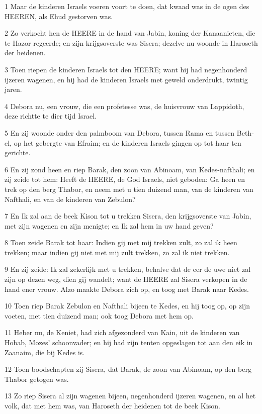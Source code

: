 \par 1 Maar de kinderen Israels voeren voort te doen, dat kwaad was in de ogen des HEEREN, als Ehud gestorven was.
\par 2 Zo verkocht hen de HEERE in de hand van Jabin, koning der Kanaanieten, die te Hazor regeerde; en zijn krijgsoverste was Sisera; dezelve nu woonde in Haroseth der heidenen.
\par 3 Toen riepen de kinderen Israels tot den HEERE; want hij had negenhonderd ijzeren wagenen, en hij had de kinderen Israels met geweld onderdrukt, twintig jaren.
\par 4 Debora nu, een vrouw, die een profetesse was, de huisvrouw van Lappidoth, deze richtte te dier tijd Israel.
\par 5 En zij woonde onder den palmboom van Debora, tussen Rama en tussen Beth-el, op het gebergte van Efraim; en de kinderen Israels gingen op tot haar ten gerichte.
\par 6 En zij zond heen en riep Barak, den zoon van Abinoam, van Kedes-nafthali; en zij zeide tot hem: Heeft de HEERE, de God Israels, niet geboden: Ga heen en trek op den berg Thabor, en neem met u tien duizend man, van de kinderen van Nafthali, en van de kinderen van Zebulon?
\par 7 En Ik zal aan de beek Kison tot u trekken Sisera, den krijgsoverste van Jabin, met zijn wagenen en zijn menigte; en Ik zal hem in uw hand geven?
\par 8 Toen zeide Barak tot haar: Indien gij met mij trekken zult, zo zal ik heen trekken; maar indien gij niet met mij zult trekken, zo zal ik niet trekken.
\par 9 En zij zeide: Ik zal zekerlijk met u trekken, behalve dat de eer de uwe niet zal zijn op dezen weg, dien gij wandelt; want de HEERE zal Sisera verkopen in de hand ener vrouw. Alzo maakte Debora zich op, en toog met Barak naar Kedes.
\par 10 Toen riep Barak Zebulon en Nafthali bijeen te Kedes, en hij toog op, op zijn voeten, met tien duizend man; ook toog Debora met hem op.
\par 11 Heber nu, de Keniet, had zich afgezonderd van Kain, uit de kinderen van Hobab, Mozes' schoonvader; en hij had zijn tenten opgeslagen tot aan den eik in Zaanaim, die bij Kedes is.
\par 12 Toen boodschapten zij Sisera, dat Barak, de zoon van Abinoam, op den berg Thabor getogen was.
\par 13 Zo riep Sisera al zijn wagenen bijeen, negenhonderd ijzeren wagenen, en al het volk, dat met hem was, van Haroseth der heidenen tot de beek Kison.
